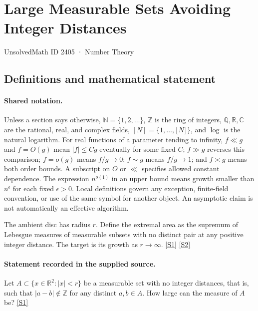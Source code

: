 \documentclass[11pt,a4paper]{article}
\newcommand{\N}{\mathbb{N}}
\newcommand{\Z}{\mathbb{Z}}
\newcommand{\Q}{\mathbb{Q}}
\newcommand{\R}{\mathbb{R}}
\newcommand{\C}{\mathbb{C}}
\newcommand{\sref}[2]{\hyperlink{source:#1:#2}{[S#2]}}
\begin{document}

\setcounter{section}{2404}

\section{Large Measurable Sets Avoiding Integer Distances}\label{2405}

{\small\sffamily UnsolvedMath ID 2405 · Number Theory}

\subsection{Definitions and mathematical statement}

\paragraph{Shared notation.}Unless a section says otherwise, $\N=\{1,2,\ldots\}$,
$\Z$ is the ring of integers, $\Q,\R,\C$ are the rational, real, and complex
fields, $[N]=\{1,\ldots,\lfloor N\rfloor\}$, and $\log$ is the natural
logarithm. For real functions of a parameter tending to infinity,
$f\ll g$ and $f=O(g)$ mean $|f|\leq Cg$ eventually for some fixed $C$;
$f\gg g$ reverses this comparison; $f=o(g)$ means $f/g\to0$;
$f\sim g$ means $f/g\to1$; and $f\asymp g$ means both order bounds.
A subscript on $O$ or $\ll$ specifies allowed constant dependence.
The expression $n^{o(1)}$ in an upper bound means growth smaller than
$n^\epsilon$ for each fixed $\epsilon>0$. Local definitions govern any
exception, finite-field convention, or use of the same symbol for another
object. An asymptotic claim is not automatically an effective algorithm.



The ambient disc has radius $r$. Define the extremal area as the supremum of Lebesgue measures of measurable subsets with no distinct pair at any positive integer distance. The target is its growth as $r\to\infty$. \sref{2405}{1} \sref{2405}{2}

\paragraph{Statement recorded in the supplied source.}
Let $A\subset \{ x\in \mathbb{R}^2 : \lvert x\rvert <r\}$ be a measurable set with no integer distances, that is, such that $\lvert a-b\rvert \not\in \mathbb{Z}$ for any distinct $a,b\in A$. How large can the measure of $A$ be? \sref{2405}{1}
\end{document}
